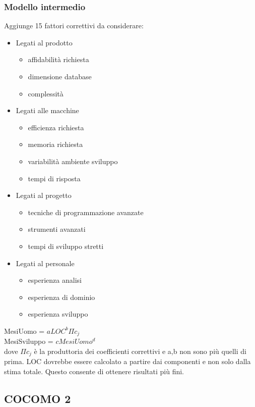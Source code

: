 \subsubsection{Modello intermedio}
Aggiunge 15 fattori correttivi da considerare:
\begin{itemize}
    \item Legati al prodotto
    \begin{itemize}
        \item affidabilità richiesta
        \item dimensione database
        \item complessità
    \end{itemize}
    \item Legati alle macchine
    \begin{itemize}
        \item efficienza richiesta
        \item memoria richiesta
        \item variabilità ambiente sviluppo
        \item tempi di risposta
    \end{itemize}
    \item Legati al progetto
    \begin{itemize}
        \item tecniche di programmazione avanzate
        \item strumenti avanzati
        \item tempi di sviluppo stretti
    \end{itemize}
    \item Legati al personale
    \begin{itemize}
        \item esperienza analisi
        \item esperienza di dominio
        \item esperienza sviluppo
    \end{itemize}
\end{itemize}
MesiUomo = \(aLOC^b\Pi c_j\) \\
MesiSviluppo = \(cMesiUomo^d\) \\

\noindent dove \(\Pi c_j\) è la produttoria dei coefficienti correttivi e a,b non sono più quelli di prima. LOC dovrebbe essere calcolato a partire dai componenti e non solo dalla stima totale. Questo consente di ottenere risultati più fini.

\subsection{COCOMO 2}

